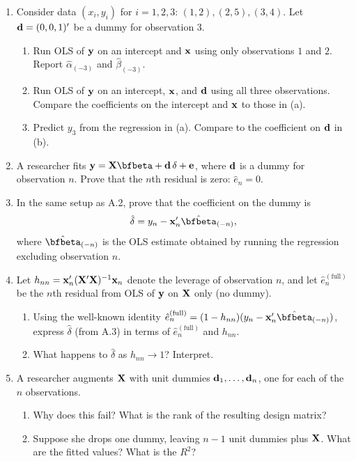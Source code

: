 \documentclass{article}
\begin{document}
\begin{enumerate}[label=\textbf{A.\arabic*},leftmargin=*,itemsep=10pt]

\item  Consider data $(x_i, y_i)$ for $i = 1, 2, 3$: $(1, 2), (2, 5), (3, 4)$.  Let ${\mathbf d} = (0, 0, 1)'$ be a dummy for observation $3$.
\begin{enumerate}[label=(\alph*)]
  \item Run OLS of ${\mathbf y}$ on an intercept and ${\mathbf x}$ using only observations $1$ and $2$.  Report $\hat\alpha_{(-3)}$ and $\hat\beta_{(-3)}$.
  \item Run OLS of ${\mathbf y}$ on an intercept, ${\mathbf x}$, and ${\mathbf d}$ using all three observations.  Compare the coefficients on the intercept and ${\mathbf x}$ to those in (a).
  \item Predict $y_3$ from the regression in (a).  Compare to the coefficient on ${\mathbf d}$ in (b).
\end{enumerate}

\item  A researcher fits $\bfy = \bfX\bfbeta + \bfd\,\delta + \bfe$, where ${\mathbf d}$ is a dummy for observation $n$.  Prove that the $n$th residual is zero: $\hat e_n = 0$.

\item  In the same setup as A.2, prove that the coefficient on the dummy is
$$\hat\delta = y_n - \bm{x}_n'\hat{\bfbeta}_{(-n)},$$
where $\hat{\bfbeta}_{(-n)}$ is the OLS estimate obtained by running the regression excluding observation $n$.

\item  Let $h_{nn} = \mathbf{x}_n'({\mathbf X}'{\mathbf X})^{-1}\mathbf{x}_n$ denote the leverage of observation $n$, and let $\hat e_n^{(\text{full})}$ be the $n$th residual from OLS of ${\mathbf y}$ on ${\mathbf X}$ only (no dummy).
\begin{enumerate}[label=(\alph*)]
  \item Using the well-known identity $\hat e_n^{(\text{full})} = (1 - h_{nn})(y_n - \bm{x}_n'\hat{\bfbeta}_{(-n)})$, express $\hat\delta$ (from A.3) in terms of $\hat e_n^{(\text{full})}$ and $h_{nn}$.
  \item What happens to $\hat\delta$ as $h_{nn} \to 1$?  Interpret.
\end{enumerate}

\item  A researcher augments ${\mathbf X}$ with unit dummies ${\mathbf d}_1, \ldots, {\mathbf d}_n$, one for each of the $n$ observations.
\begin{enumerate}[label=(\alph*)]
  \item Why does this fail?  What is the rank of the resulting design matrix?
  \item Suppose she drops one dummy, leaving $n - 1$ unit dummies plus ${\mathbf X}$.  What are the fitted values?  What is the $R^2$?
\end{enumerate}

\end{enumerate}
\end{document}
